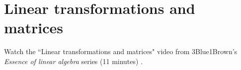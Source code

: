 \section{Linear transformations and matrices}

Watch the ``Linear transformations and matrices" video from 3Blue1Brown's
\textit{Essence of linear algebra} series (11 minutes)
\cite{bib:linalg_linear_transformations_and_matrices}.
